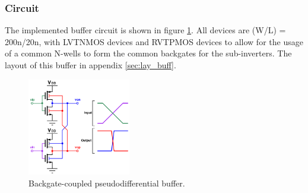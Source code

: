 		\subsubsection{Circuit}
		The implemented buffer circuit is shown in figure \ref{fig:pd_buffer_circuit}. All devices are (W/L) = 200n/20n, with LVTNMOS devices and RVTPMOS devices to allow for the usage of a common N-wells to form the common backgates for the sub-inverters. The layout of this buffer in appendix \ref{sec:lay_buff}.
			\begin{figure}[htb!]
			        \centering
			        \includegraphics[width=0.4\textwidth, angle=0]{./figs/design/pseudiff_buffer}
			    \caption{Backgate-coupled pseudodifferential buffer.}
			    \label{fig:pd_buffer_circuit}
			\end{figure}




